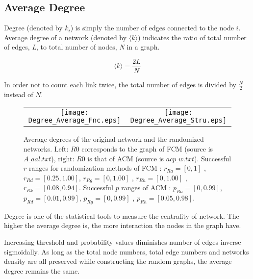 \documentclass[12pt]{article}
\begin{document}
\subsection{Average Degree}

Degree (denoted by $k_i$) is simply the number of edges connected to the node $i$. Average degree of a network (denoted by $\langle k \rangle$) indicates the ratio of total number of edges, \textit{L}, to total number of nodes, \textit{N} in a graph.
 
\begin{equation}
\langle k \rangle = \frac{2L}{N}
\end{equation} 
 
In order not to count each link twice, the total number of edges is divided by $\frac{N}{2}$ instead of $N$. 
 

\begin{figure}[htp]

  \centering

    \begin{tabular}{cc}


    \texttt{[image: Degree\_Average\_Fnc.eps]} &

    \texttt{[image: Degree\_Average\_Stru.eps]}\\

  \end{tabular}

 \label{figur}\caption{Average degrees of the original network and the randomized networks. Left: $R0$ corresponds to the graph of FCM (source is $A\_aal.txt$), right: $R0$ is that of ACM (source is $acp\_w.txt$). Successful $r$ ranges for randomization methods of FCM :  $r_{Ra}=[0,1]$ , $r_{Rd} = [0.25,1.00]$, $r_{Rg} = [0,1.00]$ , $r_{Rh} = [0,1.00]$ , $r_{Rk} = [0.08,0.94]$. Successful $p$ ranges of ACM : $p_{Ra}=[0,0.99]$, $p_{Rd}=[0.01 , 0.99]$, $p_{Rg}=[0, 0.99]$ , $p_{Rh}=[0.05 , 0.98]$. }

\end{figure}
%
Degree is one of the statistical tools to measure the centrality of network. The higher the average degree is, the more interaction the nodes in the graph have. 

Increasing threshold and probability values diminishes number of edges inverse sigmoidally. As long as the total node numbers, total edge numbers and networks density are all preserved while constructing the random graphs, the average degree remains the same. 
\end{document}
